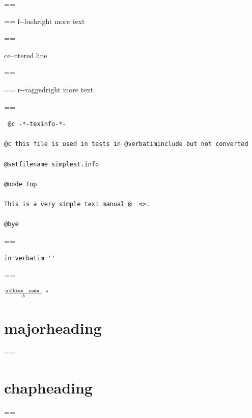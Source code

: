 \documentclass{book}
\makeatletter
\newenvironment{Texinfopreformatted}{%
  \par\GNUTobeylines\obeyspaces\frenchspacing\parskip=\z@\parindent=\z@}{}
{\catcode`\^^M=13 \gdef\GNUTobeylines{\catcode`\^^M=13 \def^^M{\null\par}}}
\newenvironment{Texinfoindented}{\begin{list}{}{}\item\relax}{\end{list}}
\newcommand{\Texinfoplaceholder}[1]{}
\newcommand{\Texinfonopagebreakheading}[2]{{\let\clearpage\relax \let\cleardoublepage\relax \let\thispagestyle\Texinfoplaceholder #1{#2}}}
\renewcommand{\_}{\Texinfounderscore\discretionary{}{}{}}
\makeatother
\begin{document}
{{\begin{Texinfoindented}
\begin{flushright}
\begin{Texinfopreformatted}
\begin{Texinfopreformatted}%
\ttfamily f{-}{-}lushright
more text
\end{Texinfopreformatted}
\end{Texinfopreformatted}
\end{flushright}
\begin{Texinfopreformatted}%
\ttfamily 
\end{Texinfopreformatted}
\begin{center}
ce--ntered line
\end{center}
\begin{Texinfopreformatted}%
\ttfamily 
\end{Texinfopreformatted}
\begin{flushleft}
\begin{Texinfopreformatted}%
\ttfamily r{-}{-}raggedright
more text
\end{Texinfopreformatted}
\end{flushleft}
\begin{Texinfopreformatted}%
\ttfamily 
\end{Texinfopreformatted}
\begin{verbatim}
 @c -*-texinfo-*-

@c this file is used in tests in @verbatiminclude but not converted

@setfilename simplest.info

@node Top

This is a very simple texi manual @  <>.

@bye
\end{verbatim}
\begin{Texinfopreformatted}%
\ttfamily 
\end{Texinfopreformatted}
\begin{verbatim}
in verbatim ''
\end{verbatim}
\begin{Texinfopreformatted}%
\ttfamily 




$\frac{a < b \texttt{tex \hbox{ code }}}{b}$ ``

\end{Texinfopreformatted}
\Texinfonopagebreakheading{\chapter*}{{majorheading}}
\begin{Texinfopreformatted}%
\ttfamily 
\end{Texinfopreformatted}
\Texinfonopagebreakheading{\chapter*}{{chapheading}}
\begin{Texinfopreformatted}%
\ttfamily 
\end{Texinfopreformatted}

\end{Texinfoindented}}}
\end{document}
